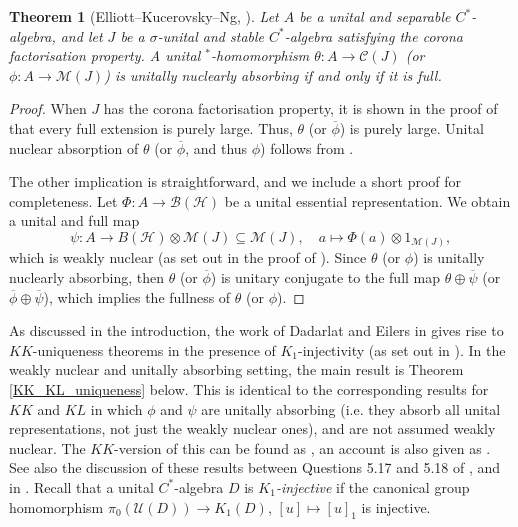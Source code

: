 \documentclass[reqno]{amsart}
\newtheorem{thm}{Theorem}[section]
\theoremstyle{definition}
\theoremstyle{remark}
\numberwithin{equation}{section}
\theoremstyle{definition}
\newcommand{\calH}{\mathcal{H}}
\newcommand{\calC}{\mathcal{C}}
\newcommand{\calB}{\mathcal{B}}
\newcommand{\calM}{\mathcal{M}}
\newcommand{\calU}{\mathcal{U}}
\begin{document}
\begin{thm}[Elliott--Kucerovsky--Ng, {\cite{EK.PJM, CFP_KN}}] 
\label{nuc_absorb_equiv} 
Let $A$ be a unital and separable $C^*$-algebra, and let $J$ be a $\sigma$-unital and stable $C^*$-algebra satisfying the corona factorisation property. A unital $^*$-homomorphism $\theta: A\rightarrow \calC(J)$ (or $\phi: A\rightarrow \calM(J)$) is unitally nuclearly absorbing if and only if it is full. 
\end{thm}  

\begin{proof} 
When $J$ has the corona factorisation property, it is shown in the proof of \cite[Theorem 3.5]{CFP_KN} that every full extension is purely large. Thus, $\theta$ (or $\overline{\phi}$) is purely large. Unital nuclear absorption of $\theta$ (or $\overline{\phi}$, and thus $\phi$) follows from \cite[Theorem 6]{EK.PJM}. 

The other implication is straightforward, and we include a short proof for completeness. Let $\Phi: A\rightarrow \calB(\calH)$ be a unital essential representation. We obtain a unital and full map 
\begin{equation} 
\label{full_absorb_map_prototype} 
\psi: A\rightarrow B(\calH)\otimes \calM(J) \subseteq \calM(J), \quad a\mapsto \Phi(a)\otimes 1_{\calM(J)}, 
\end{equation} 
which is weakly nuclear (as set out in the proof of \cite[Lemma 12]{EK.PJM}).  Since $\theta$ (or $\phi$) is unitally nuclearly absorbing, then $\theta$ (or $\overline{\phi}$) is unitary conjugate to the full map $\theta \oplus \overline{\psi}$ (or $\overline{\phi}\oplus \overline{\psi}$), which implies the fullness of $\theta$ (or $\phi$). 
\end{proof} 

As discussed in the introduction, the work of Dadarlat and Eilers in \cite{Dadarlet-Eilers} gives rise to $KK$-uniqueness theorems in the presence of $K_1$-injectivity (as set out in \cite{ess-codim, K1-injective, CGSTW}). In the weakly nuclear and unitally absorbing setting, the main result is Theorem \ref{KK_KL_uniqueness} below. This is identical to the corresponding results for $KK$ and $KL$ in which $\phi$ and $\psi$ are unitally absorbing (i.e. they absorb all unital representations, not just the weakly nuclear ones), and are not assumed weakly nuclear. The $KK$-version of this can be found as \cite[Theorem 2.6]{K1-injective}, an account is also given as \cite[Theorem 4.3.5]{Hua_thesis}. See also the discussion of these results between Questions 5.17 and 5.18 of \cite{CGSTW}, and in \cite[Section 17]{99Q}. Recall that a unital $C^*$-algebra $D$ is \emph{$K_{1}$-injective} if the canonical
group homomorphism $\pi_{0}(\calU(D))\rightarrow K_{1}(D)$, $[u]\mapsto [u]_{1}$ is injective. 
\end{document}
